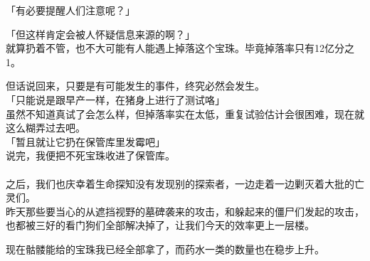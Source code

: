 「有必要提醒人们注意呢？」

「但这样肯定会被人怀疑信息来源的啊？」\\

就算扔着不管，也不大可能有人能遇上掉落这个宝珠。毕竟掉落率只有12亿分之1。

但话说回来，只要是有可能发生的事件，终究必然会发生。\\

「只能说是跟早产一样，在猪身上进行了测试咯」\\

虽然不知道真试了会怎么样，但掉落率实在太低，重复试验估计会很困难，现在就这么糊弄过去吧。\\

「暂且就让它扔在保管库里发霉吧」\\

说完，我便把不死宝珠收进了保管库。\\

\sqsplit\\

之后，我们也庆幸着生命探知没有发现别的探索者，一边走着一边剿灭着大批的亡灵们。\\

昨天那些要当心的从遮挡视野的墓碑袭来的攻击，和躲起来的僵尸们发起的攻击，也都被三好的看门狗们全部解决掉了，让我们今天的效率更上一层楼。

现在骷髅能给的宝珠我已经全部拿了，而药水一类的数量也在稳步上升。\\

